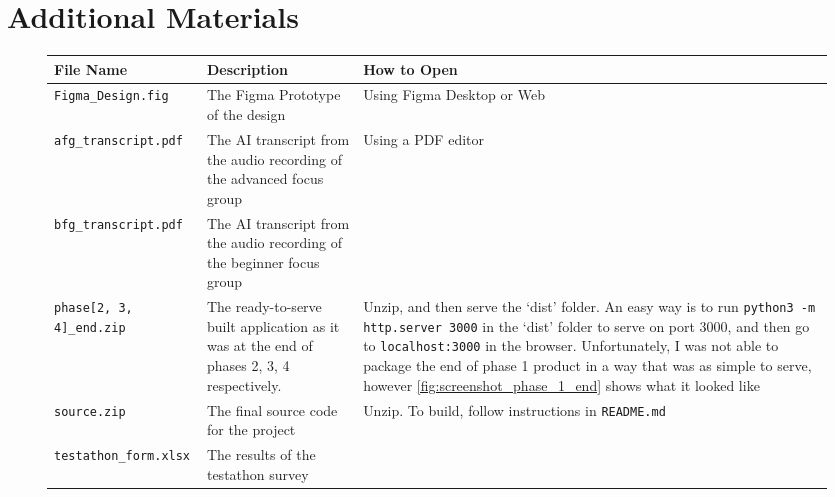 \chapter{Additional Materials}
\label{appx:additional_mats}
\begin{figure}[h]
    \centering
    \begin{tabular}{|m{4cm}|p{5cm}|>{\raggedright\arraybackslash}p{5.5cm}|}
        \hline\textbf{File Name} & \textbf{Description} & \textbf{How to Open} \\[1ex] \hline\vspace{1ex}
        \verb|Figma_Design.fig| & The Figma Prototype of the design & Using Figma Desktop or Web\\[1ex] \hline\vspace{1ex}
        \verb|afg_transcript.pdf| & The AI transcript from the audio recording of the advanced focus group & Using a PDF editor \\[1ex] \cline{1-2}\vspace{1ex}
        \verb|bfg_transcript.pdf| & The AI transcript from the audio recording of the beginner focus group & \ \\[1ex] \hline\vspace{1ex}

        \verb|phase[2, 3, 4]_end.zip| & The ready-to-serve built application as it was at the end of phases 2, 3, 4 respectively. & Unzip, and then serve the `dist' folder. An easy way is to run \verb|python3 -m http.server 3000| in the `dist' folder to serve on port 3000, and then go to \verb|localhost:3000| in the browser. Unfortunately, I was not able to package the end of phase 1 product in a way that was as simple to serve, however \ref{fig:screenshot_phase_1_end} shows what it looked like\\[1ex]\hline\vspace{1ex}

        \verb|source.zip| & The final source code for the project & Unzip. To build, follow instructions in \verb|README.md| \\[1ex] \hline\vspace{1ex}

        \verb|testathon_form.xlsx| & The results of the testathon survey & \ \\ \hline
    \end{tabular}
\end{figure}
